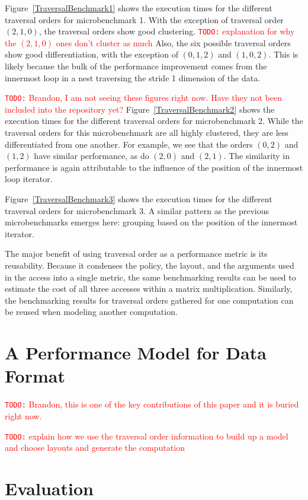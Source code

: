 \documentclass[sigconf, table]{acmart}
\newcommand{\todo}[1]{{\textcolor{red}{{\tt{TODO:}}\,\,#1 }}}
\begin{document}
Figure~\ref{TraversalBenchmark1} shows the execution times for the different traversal orders for microbenchmark 1. 
With the exception of traversal order $(2,1,0)$, the traversal orders show good clustering.
\todo{explanation for why the $(2,1,0)$ ones don't cluster as much}
Also, the six possible traversal orders show good differentiation, with the exception of $(0,1,2)$ and $(1,0,2)$. 
This is likely because the bulk of the performance improvement comes from the innermost loop in a nest traversing the stride 1 dimension of the data.


\todo{Brandon, I am not seeing these figures right now.  Have they not been included into the repository yet?}
Figure~\ref{TraversalBenchmark2} shows the execution times for the different traversal orders for microbenchmark 2. 
While the traversal orders for this microbenchmark are all highly clustered, they are less differentiated from one another. 
For example, we see that the orders $(0,2)$ and $(1,2)$ have similar performance, as do $(2,0)$ and $(2,1)$. 
The similarity in performance is again attributable to the influence of the position of the innermost loop iterator. 



Figure~\ref{TraversalBenchmark3} shows the execution times for the different traversal orders for microbenchmark 3. 
A similar pattern as the previous microbenchmarks emerges here: grouping based on the position of the innermost iterator. 

The major benefit of using traversal order as a performance metric is its reusability. 
Because it condenses the policy, the layout, and the arguments used in the access into a single metric, the same benchmarking results can be used to estimate the cost of all three accesses within a matrix multiplication. 
Similarly, the benchmarking results for traversal orders gathered for one computation can be reused when modeling another computation.

\section{A Performance Model for Data Format}
\todo{Brandon, this is one of the key contributions of this paper and it is buried right now.}

\todo{explain how we use the traversal order information to build up a model and choose layouts and generate the computation}

\section{Evaluation}
\end{document}
